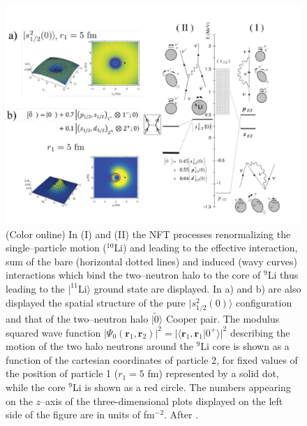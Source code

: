   \begin{figure}[h!]
  \centerline{\includegraphics*[width=\textwidth,angle=0]{nutshell/figs/fig1F3.pdf}}
  \caption{(Color online) In (I) and (II) the NFT processes renormalizing the single--particle motion ($^{10}$Li) and leading to the effective interaction, sum of the bare (horizontal dotted lines) and induced (wavy curves) interactions which bind the two--neutron halo to the core of $^{9}$Li  thus leading to the $|^{11}$Li$\rangle$ ground state are displayed. In a) and b) are also displayed the  spatial structure of the pure $|s_{1/2}^2(0)\rangle$ configuration and that of the two--neutron halo $|\tilde 0\rangle$ Cooper pair. The modulus squared wave function $|\Psi_0(\mathbf{r}_1,\mathbf{r}_2)|^2=|\langle \mathbf{r}_1,\mathbf{r}_1|0^+\rangle|^2$ describing the motion of the two halo neutrons around the $^9$Li core 
  is shown as a function of the cartesian coordinates of particle 2, for fixed values of the
  position of particle 1 ($r_1 = 5$ fm) represented  by a solid dot, while the core $^9$Li is shown as a red
  circle. The numbers appearing on the $z$--axis of the three-dimensional plots displayed on the left side of the figure are in units of fm$^{-2}$. After \cite{Barranco:01}.}\label{fig1F3}
  \end{figure}

